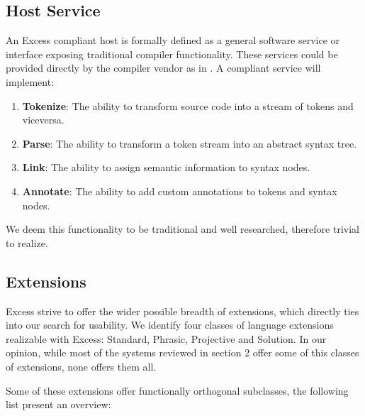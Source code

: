 \documentclass[conference]{IEEEtran}
\begin{document}
\subsection{Host Service}
An Excess compliant host is formally defined as a general software service or interface exposing traditional compiler functionality. These services could be provided directly by the compiler vendor as in \cite{Roslyn}. A compliant service will implement:

\begin{enumerate}
	\item \textbf{Tokenize}: The ability to transform source code into a stream of tokens and viceversa.
    	\item \textbf{Parse}: The ability to transform a token stream into an abstract syntax tree.
    	\item \textbf{Link}: The ability to assign semantic information to syntax nodes.
    	\item \textbf{Annotate}: The ability to add custom annotations to tokens and syntax nodes.
\end{enumerate}


We deem this functionality to be traditional and well researched, therefore trivial to realize. 

\subsection{Extensions}
Excess strive to offer the wider possible breadth of extensions, which directly ties into our search for usability. We identify four classes of language extensions realizable with Excess: Standard, Phrasic, Projective and Solution. 
In our opinion, while most of the systems reviewed in section 2 offer some of this classes of extensions, none offers them all.

Some of these extensions offer functionally orthogonal subclasses, the following list present an overview:
\end{document}
